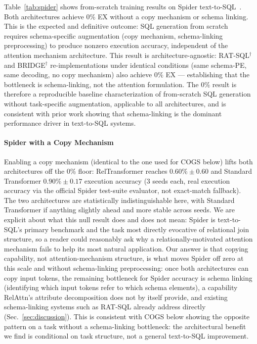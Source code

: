 \documentclass[review]{elsarticle}
\begin{document}
Table~\ref{tab:spider} shows from-scratch training results on Spider text-to-SQL~\cite{yu2018spider}. Both architectures achieve 0\% EX without a copy mechanism or schema linking. This is the expected and definitive outcome: SQL generation from scratch requires schema-specific augmentation (copy mechanism, schema-linking preprocessing) to produce nonzero execution accuracy, independent of the attention mechanism architecture. This result is architecture-agnostic: RAT-SQL$^\dagger$ and BRIDGE$^\dagger$ re-implementations under identical conditions (same schema-PE, same decoding, no copy mechanism) also achieve 0\% EX --- establishing that the bottleneck is schema-linking, not the attention formulation. The 0\% result is therefore a reproducible baseline characterization of from-scratch SQL generation without task-specific augmentation, applicable to all architectures, and is consistent with prior work showing that schema-linking is the dominant performance driver in text-to-SQL systems.

\paragraph{Spider with a Copy Mechanism}
Enabling a copy mechanism (identical to the one used for COGS below) lifts both architectures off the 0\% floor: RelTransformer reaches $0.60\%{\pm}0.60$ and Standard Transformer $0.90\%{\pm}0.17$ execution accuracy (3 seeds each, real execution accuracy via the official Spider test-suite evaluator, not exact-match fallback). The two architectures are statistically indistinguishable here, with Standard Transformer if anything slightly ahead and more stable across seeds. We are explicit about what this null result does and does not mean: Spider is text-to-SQL's primary benchmark and the task most directly evocative of relational join structure, so a reader could reasonably ask why a relationally-motivated attention mechanism fails to help its most natural application. Our answer is that copying capability, not attention-mechanism structure, is what moves Spider off zero at this scale and without schema-linking preprocessing: once both architectures can copy input tokens, the remaining bottleneck for Spider accuracy is schema linking (identifying which input tokens refer to which schema elements), a capability RelAttn's attribute decomposition does not by itself provide, and existing schema-linking systems such as RAT-SQL already address directly (Sec.~\ref{sec:discussion}). This is consistent with COGS below showing the opposite pattern on a task without a schema-linking bottleneck: the architectural benefit we find is conditional on task structure, not a general text-to-SQL improvement.
\end{document}
